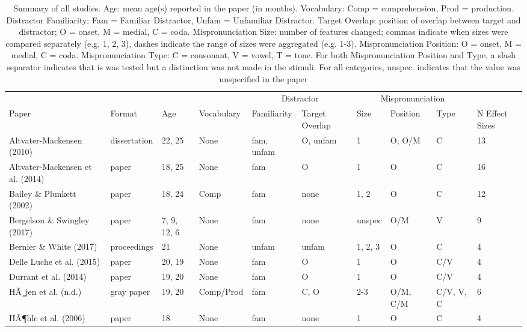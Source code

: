\documentclass[man]{apa6}
\makeatletter
\newenvironment{lltable}{\begin{landscape}\begin{center}\begin{ThreePartTable}}{\end{ThreePartTable}\end{center}\end{landscape}}
\newcommand\LastLTentrywidth{1em}
\newlength\longtablewidth
\newcommand{\getlongtablewidth}{\begingroup \ifcsname LT@\roman{LT@tables}\endcsname \global\longtablewidth=0pt \renewcommand{\LT@entry}[2]{\global\advance\longtablewidth by ##2\relax\gdef\LastLTentrywidth{##2}}\@nameuse{LT@\roman{LT@tables}} \fi \endgroup}
\makeatother
\begin{document}
\begin{lltable}


\scriptsize{
\begin{longtable}{llllllllll}\noalign{\getlongtablewidth\global\LTcapwidth=\longtablewidth}
\caption{\label{tab:SummaryTable}Summary of all studies. Age: mean age(s) reported in the paper (in months). Vocabulary: Comp = comprehension, Prod = production. Distractor Familiarity: Fam = Familiar Distractor, Unfam = Unfamiliar Distractor. Target Overlap: position of overlap between target and distractor; O = onset, M = medial, C = coda. Mispronunciation Size: number of features changed; commas indicate when sizes were compared separately (e.g. 1, 2, 3), dashes indicate the range of sizes were aggregated (e.g. 1-3). Mispronunciation Position: O = onset, M = medial, C = coda. Mispronunciation Type: C = consonant, V = vowel, T = tone. For both Mispronunciation Position and Type, a slash separator indicates that is was tested but a distinction was not made in the stimuli. For all categories, unspec. indicates that the value was unspecified in the paper}\\
\toprule
 &  &  &  & \multicolumn{2}{c}{Distractor} & \multicolumn{3}{c}{Mispronunciation}  &\\
\cmidrule(r){5-6} \cmidrule(r){7-9}
Paper & Format & Age & Vocabulary & Familiarity & Target Overlap & Size & Position & Type & N Effect Sizes\\
\midrule
Altvater-Mackensen (2010) & dissertation & 22, 25 & None & fam, unfam & O, unfam & 1 & O, O/M & C & 13\\
Altvater-Mackensen et al. (2014) & paper & 18, 25 & None & fam & O & 1 & O & C & 16\\
Bailey \& Plunkett (2002) & paper & 18, 24 & Comp & fam & none & 1, 2 & O & C & 12\\
Bergelson \& Swingley (2017) & paper & 7, 9, 12, 6 & None & fam & none & unspec & O/M & V & 9\\
Bernier \& White (2017) & proceedings & 21 & None & unfam & unfam & 1, 2, 3 & O & C & 4\\
Delle Luche et al. (2015) & paper & 20, 19 & None & fam & O & 1 & O & C/V & 4\\
Durrant et al. (2014) & paper & 19, 20 & None & fam & O & 1 & O & C/V & 4\\
HÃ¸jen et al. (n.d.) & gray paper & 19, 20 & Comp/Prod & fam & C, O & 2-3 & O/M, C/M & C/V, V, C & 6\\
HÃ¶hle et al. (2006) & paper & 18 & None & fam & none & 1 & O & C & 4\\

\end{longtable}}
\end{lltable}
\end{document}
